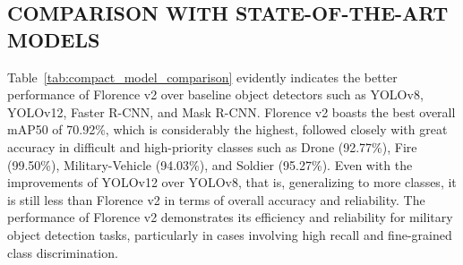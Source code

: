\documentclass[fleqn,10pt,lineno]{wlpeerj}
\begin{document}
\subsection{COMPARISON WITH STATE-OF-THE-ART MODELS}

Table~\ref{tab:compact_model_comparison} evidently indicates the better performance of Florence v2 over baseline object detectors such as YOLOv8, YOLOv12, Faster R-CNN, and Mask R-CNN.    Florence v2 boasts the best overall mAP50 of 70.92\%, which is considerably the highest, followed closely with great accuracy in difficult and high-priority classes such as Drone (92.77\%), Fire (99.50\%), Military-Vehicle (94.03\%), and Soldier (95.27\%). Even with the improvements of YOLOv12 over YOLOv8, that is, generalizing to more classes, it is still less than Florence v2 in terms of overall accuracy and reliability. The performance of Florence v2 demonstrates its efficiency and reliability for military object detection tasks, particularly in cases involving high recall and fine-grained class discrimination.
\end{document}
